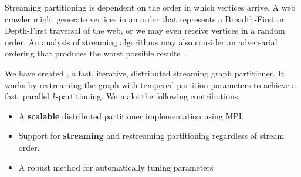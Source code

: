 Streaming partitioning is dependent on the order in which vertices arrive.
A web crawler might generate vertices in an order that represents a Breadth-First or Depth-First traversal of the web, or we may even receive vertices in a random order.
An analysis of streaming algorithms may also consider an adversarial ordering that produces the worst possible results~\cite{Stanton:2012:SGP:2339530.2339722}.

We have created \ourmethod, a fast, iterative, distributed streaming graph partitioner.
It works by restreaming the graph with tempered partition parameters to achieve a fast, parallel \textit{k}-partitioning.
We make the following contributions:
\begin{itemize}
\item A \textbf{scalable} distributed partitioner implementation using MPI.
\item Support for \textbf{streaming} and restreaming partitioning regardless of stream order.
\item A robust method for automatically tuning \ourmethod parameters 
\end{itemize}



